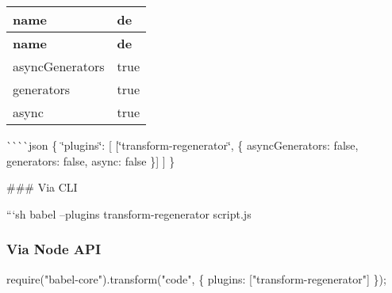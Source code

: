 \tabulinesep=1mm
\begin{longtabu} spread 0pt [c]{*{2}{|X[-1]}|}
\hline
\rowcolor{\tableheadbgcolor}\textbf{ name  }&\textbf{ de   }\\
\endfirsthead
\hline
\endfoot
\hline
\rowcolor{\tableheadbgcolor}\textbf{ name  }&\textbf{ de   }\\
\endhead
async\+Generators  &true   \\
generators  &true   \\
async  &true   \\
\end{longtabu}


\`{}\`{}\`{}\`{}json \{ \char`\"{}plugins\char`\"{}\+: \mbox{[} \mbox{[}\char`\"{}transform-\/regenerator\char`\"{}, \{ async\+Generators\+: false, generators\+: false, async\+: false \}\mbox{]} \mbox{]} \} 
\begin{DoxyCode}
### Via CLI

```sh
babel --plugins transform-regenerator script.js
\end{DoxyCode}


\subsubsection*{Via Node A\+PI}


\begin{DoxyCode}
require("babel-core").transform("code", \{
  plugins: ["transform-regenerator"]
\});
\end{DoxyCode}
 
